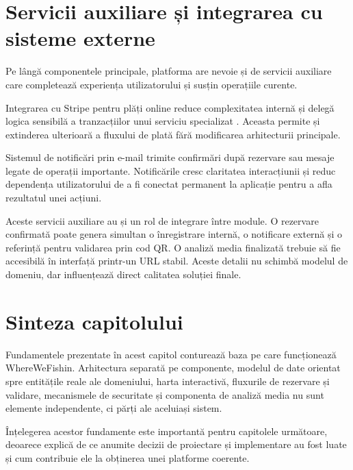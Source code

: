 \section{Servicii auxiliare și integrarea cu sisteme externe}

Pe lângă componentele principale, platforma are nevoie și de servicii auxiliare care completează experiența utilizatorului și susțin operațiile curente.

Integrarea cu Stripe pentru plăți online reduce complexitatea internă și delegă logica sensibilă a tranzacțiilor unui serviciu specializat \citep{stripe}. Aceasta permite și extinderea ulterioară a fluxului de plată fără modificarea arhitecturii principale.

Sistemul de notificări prin e-mail trimite confirmări după rezervare sau mesaje legate de operații importante. Notificările cresc claritatea interacțiunii și reduc dependența utilizatorului de a fi conectat permanent la aplicație pentru a afla rezultatul unei acțiuni.

Aceste servicii auxiliare au și un rol de integrare între module. O rezervare confirmată poate genera simultan o înregistrare internă, o notificare externă și o referință pentru validarea prin cod QR. O analiză media finalizată trebuie să fie accesibilă în interfață printr-un URL stabil. Aceste detalii nu schimbă modelul de domeniu, dar influențează direct calitatea soluției finale.

\section{Sinteza capitolului}

Fundamentele prezentate în acest capitol conturează baza pe care funcționează WhereWeFishin. Arhitectura separată pe componente, modelul de date orientat spre entitățile reale ale domeniului, harta interactivă, fluxurile de rezervare și validare, mecanismele de securitate și componenta de analiză media nu sunt elemente independente, ci părți ale aceluiași sistem.

Înțelegerea acestor fundamente este importantă pentru capitolele următoare, deoarece explică de ce anumite decizii de proiectare și implementare au fost luate și cum contribuie ele la obținerea unei platforme coerente.
